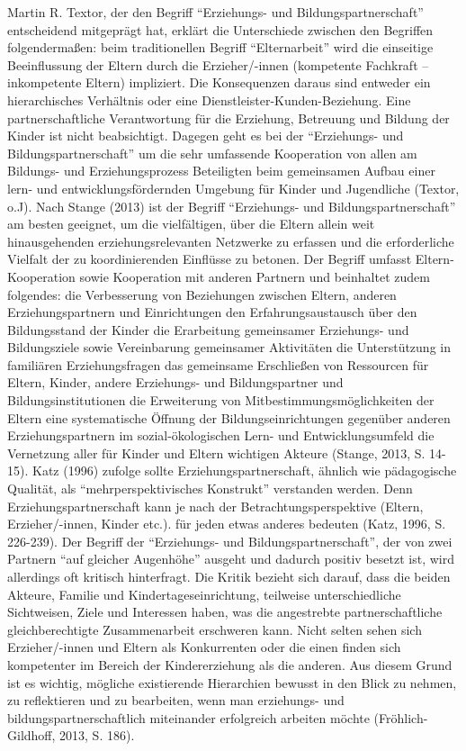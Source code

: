 \documentclass[12pt,a4paper]{article}
\begin{document}
Martin R. Textor, der den Begriff "`Erziehungs- und Bildungspartnerschaft"' entscheidend mitgeprägt hat, erklärt die Unterschiede zwischen den Begriffen folgendermaßen: beim traditionellen Begriff "`Elternarbeit"' wird die einseitige Beeinflussung der Eltern durch die Erzieher/-innen (kompetente Fachkraft – inkompetente Eltern) impliziert. Die Konsequenzen daraus sind entweder ein hierarchisches Verhältnis oder eine Dienstleister-Kunden-Beziehung. Eine partnerschaftliche Verantwortung für die Erziehung, Betreuung und Bildung der Kinder ist nicht beabsichtigt. Dagegen geht es bei der "`Erziehungs- und Bildungspartnerschaft"' um die sehr umfassende Kooperation von allen am Bildungs- und Erziehungsprozess Beteiligten beim gemeinsamen Aufbau einer lern- und entwicklungsfördernden Umgebung für Kinder und Jugendliche (Textor, o.J).
	Nach Stange (2013) ist der Begriff "`Erziehungs- und Bildungspartnerschaft"' am besten geeignet, um die vielfältigen, über die Eltern allein weit hinausgehenden erziehungsrelevanten Netzwerke zu erfassen und die erforderliche Vielfalt der zu koordinierenden Einflüsse zu betonen. Der Begriff umfasst Eltern-Kooperation sowie Kooperation mit anderen Partnern und beinhaltet zudem folgendes:
die Verbesserung von Beziehungen zwischen Eltern, anderen Erziehungspartnern und Einrichtungen
den Erfahrungsaustausch über den Bildungsstand der Kinder
die Erarbeitung gemeinsamer Erziehungs- und Bildungsziele sowie Vereinbarung gemeinsamer Aktivitäten
die Unterstützung in familiären Erziehungsfragen
das gemeinsame Erschließen von Ressourcen für Eltern, Kinder, andere Erziehungs- und Bildungspartner und Bildungsinstitutionen
die Erweiterung von Mitbestimmungsmöglichkeiten der Eltern
eine systematische Öffnung der Bildungseinrichtungen gegenüber anderen Erziehungspartnern im sozial-ökologischen Lern- und Entwicklungsumfeld
die Vernetzung aller für Kinder und Eltern wichtigen Akteure
(Stange, 2013, S. 14-15).
	Katz (1996) zufolge sollte Erziehungspartnerschaft, ähnlich wie pädagogische Qualität, als "`mehrperspektivisches Konstrukt"' verstanden werden. Denn Erziehungspartnerschaft kann je nach der Betrachtungsperspektive (Eltern, Erzieher/-innen, Kinder etc.). für jeden etwas anderes bedeuten (Katz, 1996, S. 226-239).
	Der Begriff der "`Erziehungs- und Bildungspartnerschaft"', der von zwei Partnern "`auf gleicher Augenhöhe"' ausgeht und dadurch positiv besetzt ist, wird allerdings oft kritisch hinterfragt. Die Kritik bezieht sich darauf, dass die beiden Akteure, Familie und Kindertageseinrichtung, teilweise unterschiedliche Sichtweisen, Ziele und Interessen haben, was die angestrebte partnerschaftliche gleichberechtigte Zusammenarbeit erschweren kann. Nicht selten sehen sich Erzieher/-innen und Eltern als Konkurrenten oder die einen finden sich kompetenter im Bereich der Kindererziehung als die anderen. Aus diesem Grund ist es wichtig, mögliche existierende Hierarchien bewusst in den Blick zu nehmen, zu reflektieren und zu bearbeiten, wenn man erziehungs- und bildungspartnerschaftlich miteinander erfolgreich arbeiten möchte (Fröhlich-Gildhoff, 2013, S. 186).
\end{document}
